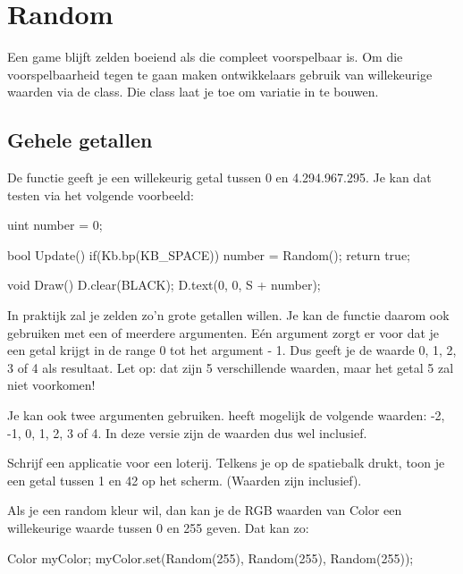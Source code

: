\chapter{Random}
Een game blijft zelden boeiend als die compleet voorspelbaar is. Om die voorspelbaarheid tegen te gaan maken ontwikkelaars gebruik van willekeurige waarden via de  class. Die class laat je toe om variatie in te bouwen. 

\section{Gehele getallen}
De functie  geeft je een willekeurig getal tussen 0 en 4.294.967.295. Je kan dat testen via het volgende voorbeeld:

\begin{code}
uint number = 0;

bool Update() {
  if(Kb.bp(KB_SPACE)) number = Random();
	return true;
}

void Draw() {
	D.clear(BLACK);
	D.text(0, 0, S + number);
}
\end{code}

In praktijk zal je zelden zo'n grote getallen willen. Je kan de functie  daarom ook gebruiken met een of meerdere argumenten. E\'en argument zorgt er voor dat je een getal krijgt in de range 0 tot het argument - 1. Dus  geeft je de waarde 0, 1, 2, 3 of 4 als resultaat. Let op: dat zijn 5 verschillende waarden, maar het getal 5 zal niet voorkomen!

Je kan ook twee argumenten gebruiken.  heeft mogelijk de volgende waarden: -2, -1, 0, 1, 2, 3 of 4. In deze versie zijn de waarden dus wel inclusief.

\begin{exercise}
Schrijf een applicatie voor een loterij. Telkens je op de spatiebalk drukt, toon je een getal tussen 1 en 42 op het scherm. (Waarden zijn inclusief).
\end{exercise}

\begin{note}
Als je een random kleur wil, dan kan je de RGB waarden van Color een willekeurige waarde tussen 0 en 255 geven. Dat kan zo:

\begin{code}
Color myColor;
myColor.set(Random(255), Random(255), Random(255));
\end{code}
\end{note}

